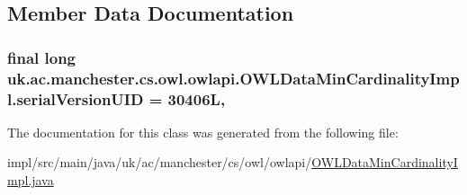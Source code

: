 \subsection{Member Data Documentation}
\hypertarget{classuk_1_1ac_1_1manchester_1_1cs_1_1owl_1_1owlapi_1_1_o_w_l_data_min_cardinality_impl_ac3b6ebf1c15ae6a421677d257fdfdfb1}{
\subsubsection[{serial\-Version\-U\-I\-D}]{\setlength{\rightskip}{0pt plus 5cm}final long uk.\-ac.\-manchester.\-cs.\-owl.\-owlapi.\-O\-W\-L\-Data\-Min\-Cardinality\-Impl.\-serial\-Version\-U\-I\-D = 30406\-L\hspace{0.3cm}{\ttfamily [static]}, {\ttfamily [private]}}}\label{classuk_1_1ac_1_1manchester_1_1cs_1_1owl_1_1owlapi_1_1_o_w_l_data_min_cardinality_impl_ac3b6ebf1c15ae6a421677d257fdfdfb1}


The documentation for this class was generated from the following file\-:\begin{DoxyCompactItemize}
\item 
impl/src/main/java/uk/ac/manchester/cs/owl/owlapi/\hyperlink{_o_w_l_data_min_cardinality_impl_8java}{O\-W\-L\-Data\-Min\-Cardinality\-Impl.\-java}\end{DoxyCompactItemize}
